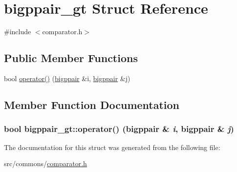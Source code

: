 \hypertarget{structbigppair__gt}{
\section{bigppair\_\-gt Struct Reference}
\label{structbigppair__gt}
}


{\ttfamily \#include $<$comparator.h$>$}

\subsection*{Public Member Functions}
\begin{DoxyCompactItemize}
\item 
bool \hyperlink{structbigppair__gt_a7668588207ee98d74c5aae7959786678}{operator()} (\hyperlink{types_8h_a1c2f735729dc971f429fc773b2a0784a}{bigppair} \&i, \hyperlink{types_8h_a1c2f735729dc971f429fc773b2a0784a}{bigppair} \&j)
\end{DoxyCompactItemize}


\subsection{Member Function Documentation}
\hypertarget{structbigppair__gt_a7668588207ee98d74c5aae7959786678}{
\subsubsection[{operator()}]{\setlength{\rightskip}{0pt plus 5cm}bool bigppair\_\-gt::operator() ({\bf bigppair} \& {\em i}, \/  {\bf bigppair} \& {\em j})}}
\label{structbigppair__gt_a7668588207ee98d74c5aae7959786678}


The documentation for this struct was generated from the following file:\begin{DoxyCompactItemize}
\item 
src/commons/\hyperlink{comparator_8h}{comparator.h}\end{DoxyCompactItemize}
